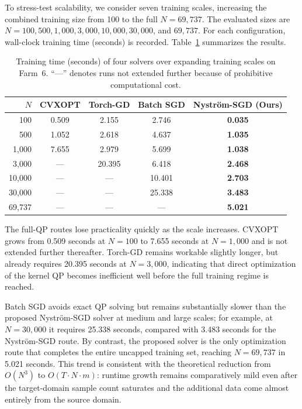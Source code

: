 \documentclass[a4paper]{cas-sc}
\begin{document}
To stress-test scalability, we consider seven training scales, increasing the combined training size from 100 to the full $N=69{,}737$. The evaluated sizes are $N=100, 500, 1{,}000, 3{,}000, 10{,}000, 30{,}000$, and $69{,}737$.
For each configuration, wall-clock training time (seconds) is recorded. Table~\ref{tab:scalability_results} summarizes the results.

\begin{table}[ht]
\centering
\caption{Training time (seconds) of four solvers over expanding training scales on Farm~6. ``---'' denotes runs not extended further because of prohibitive computational cost.}
{\small
\setlength{\tabcolsep}{2.6mm}
\begin{tabular}{rcccc}
\toprule
$N$ & CVXOPT & Torch-GD & Batch SGD & Nystr\"{o}m-SGD (Ours) \\
\midrule
100      & 0.509 & 2.155 & 2.746 & \textbf{0.035} \\
500      & 1.052 & 2.618 & 4.637 & \textbf{1.035} \\
1{,}000  & 7.655 & 2.979 & 5.699 & \textbf{1.038} \\
3{,}000  & --- & 20.395 & 6.418 & \textbf{2.468} \\
10{,}000 & --- & --- & 10.401 & \textbf{2.703} \\
30{,}000 & --- & --- & 25.338 & \textbf{3.483} \\
69{,}737 & --- & --- & --- & \textbf{5.021} \\
\bottomrule
\end{tabular}
}
\label{tab:scalability_results}
\end{table}

The full-QP routes lose practicality quickly as the scale increases. CVXOPT grows from 0.509 seconds at $N=100$ to 7.655 seconds at $N=1{,}000$ and is not extended further thereafter. Torch-GD remains workable slightly longer, but already requires 20.395 seconds at $N=3{,}000$, indicating that direct optimization of the kernel QP becomes inefficient well before the full training regime is reached.

Batch SGD avoids exact QP solving but remains substantially slower than the proposed Nystr\"{o}m-SGD solver at medium and large scales; for example, at $N=30{,}000$ it requires 25.338 seconds, compared with 3.483 seconds for the Nystr\"{o}m-SGD route. By contrast, the proposed solver is the only optimization route that completes the entire uncapped training set, reaching $N=69{,}737$ in 5.021 seconds. This trend is consistent with the theoretical reduction from $O(N^3)$ to $O(T \cdot N \cdot m)$: runtime growth remains comparatively mild even after the target-domain sample count saturates and the additional data come almost entirely from the source domain.
\end{document}
